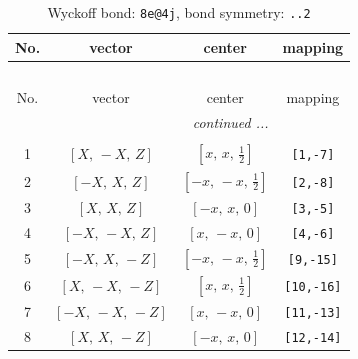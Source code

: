 \documentclass[fleqn,8pt]{jsarticle}
\begin{document}
\begin{longtable}{cccc}
\caption{Wyckoff bond: {\tt 8e@4j}, bond symmetry: {\tt ..2}}
 \\
 \hline \hline
No. & vector & center & mapping \\ \hline \endfirsthead

\multicolumn{3}{l}{\tablename\ \thetable{}} \\
 \hline \hline
No. & vector & center & mapping \\ \hline \endhead

 \hline \hline
\multicolumn{3}{r}{\footnotesize\it continued ...} \\ \endfoot

 \hline \hline
\multicolumn{3}{r}{} \\ \endlastfoot

1 & $\left[ X,\, - X,\, Z \right]$ & $\left[ x,\, x,\, \frac{1}{2} \right]$ & {\tt [1,-7]} \\ \hline
2 & $\left[ - X,\, X,\, Z \right]$ & $\left[ - x,\, - x,\, \frac{1}{2} \right]$ & {\tt [2,-8]} \\ \hline
3 & $\left[ X,\, X,\, Z \right]$ & $\left[ - x,\, x,\, 0 \right]$ & {\tt [3,-5]} \\ \hline
4 & $\left[ - X,\, - X,\, Z \right]$ & $\left[ x,\, - x,\, 0 \right]$ & {\tt [4,-6]} \\ \hline
5 & $\left[ - X,\, X,\, - Z \right]$ & $\left[ - x,\, - x,\, \frac{1}{2} \right]$ & {\tt [9,-15]} \\ \hline
6 & $\left[ X,\, - X,\, - Z \right]$ & $\left[ x,\, x,\, \frac{1}{2} \right]$ & {\tt [10,-16]} \\ \hline
7 & $\left[ - X,\, - X,\, - Z \right]$ & $\left[ x,\, - x,\, 0 \right]$ & {\tt [11,-13]} \\ \hline
8 & $\left[ X,\, X,\, - Z \right]$ & $\left[ - x,\, x,\, 0 \right]$ & {\tt [12,-14]} \\
\end{longtable}
\renewcommand{\arraystretch}{1.2}
\end{document}

